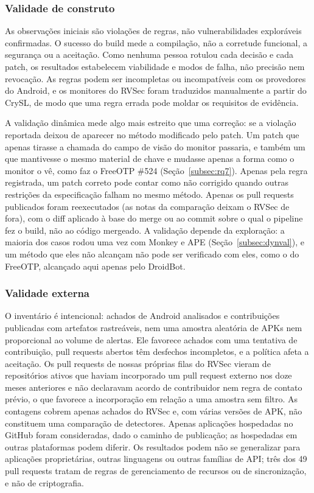 \documentclass[conference]{IEEEtran}
\begin{document}
\subsubsection{Validade de construto}

As observações iniciais são violações de regras, não vulnerabilidades exploráveis
confirmadas. O sucesso do build mede a compilação, não a corretude funcional,
a segurança ou a aceitação. Como nenhuma pessoa rotulou cada decisão
e cada patch, os resultados estabelecem viabilidade e modos de falha, não precisão
nem revocação. As regras podem ser incompletas ou incompatíveis com os provedores do Android, e
os monitores do RVSec foram traduzidos manualmente a partir do CrySL, de modo que uma regra errada pode moldar
os requisitos de evidência.

A validação dinâmica mede algo mais estreito que uma correção: se a
violação reportada deixou de aparecer no método modificado pelo patch. Um patch que apenas
tirasse a chamada do campo de visão do monitor passaria, e também um que
mantivesse o mesmo material de chave e mudasse apenas a forma como o monitor o vê,
como faz o FreeOTP \#524 (Seção~\ref{subsec:rq7}). Apenas pela regra registrada, um patch correto pode contar como não corrigido
quando outras restrições da especificação falham no mesmo método. Apenas os pull requests publicados foram reexecutados (as notas da comparação
deixam o RVSec de fora), com o diff aplicado à base do merge ou ao commit sobre
o qual o pipeline fez o build, não ao código mergeado. A validação depende da
exploração: a maioria dos casos rodou uma vez com Monkey e APE
(Seção~\ref{subsec:dynval}), e um método que eles não alcançam não pode ser
verificado com eles, como o do FreeOTP, alcançado aqui apenas pelo DroidBot.

\subsubsection{Validade externa}

O inventário é intencional: achados de Android analisados e contribuições
publicadas com artefatos rastreáveis, nem uma amostra aleatória de APKs nem
proporcional ao volume de alertas. Ele favorece achados com uma tentativa de
contribuição, pull requests abertos têm desfechos incompletos, e a política afeta a
aceitação. Os pull requests de nossas próprias filas do RVSec vieram de repositórios
ativos que haviam incorporado um pull request externo nos doze meses anteriores e não
declaravam acordo de contribuidor nem regra de contato prévio, o que favorece a
incorporação em relação a uma amostra sem filtro. As contagens cobrem apenas achados do RVSec e, com várias versões de APK, não constituem uma comparação
de detectores.
Apenas aplicações hospedadas no GitHub foram consideradas,
dado o caminho de publicação; as hospedadas em outras plataformas podem diferir. Os resultados podem não se generalizar para aplicações proprietárias, outras
linguagens ou outras famílias de API; três dos 49 pull requests tratam de
regras de gerenciamento de recursos ou de sincronização, e não de criptografia.
\end{document}
